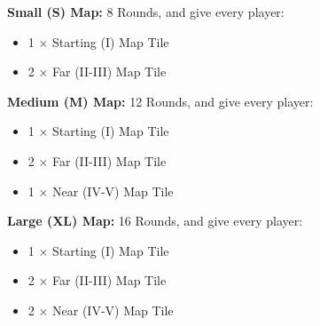 \begin{multicols}{2}
\textbf{Small (S) Map:} 8 Rounds, and give every player:
\begin{itemize}
  \item 1 × Starting (I) Map Tile
  \item 2 × Far (II-III) Map Tile
\end{itemize}

\textbf{Medium (M) Map:} 12 Rounds, and give every player:
\begin{itemize}
  \item 1 × Starting (I) Map Tile
  \item 2 × Far (II-III) Map Tile
  \item 1 × Near (IV-V) Map Tile
\end{itemize}

\textbf{Large (XL) Map:} 16 Rounds, and give every player:
\begin{itemize}
  \item 1 × Starting (I) Map Tile
  \item 2 × Far (II-III) Map Tile
  \item 2 × Near (IV-V) Map Tile
\end{itemize}

\medskip


\end{multicols}

